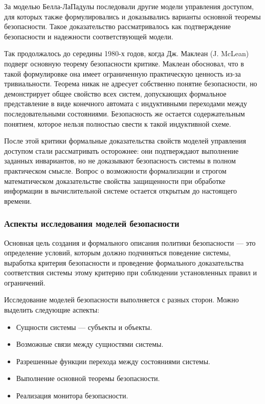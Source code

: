 За моделью Белла-ЛаПадулы последовали другие модели управления доступом, для которых также формулировались и доказывались варианты основной теоремы безопасности. Такое доказательство рассматривалось как подтверждение безопасности и надежности соответствующей модели.

Так продолжалось до середины 1980-х годов, когда Дж. Маклеан (J. McLean) подверг основную теорему безопасности критике. Маклеан обосновал, что в такой формулировке она имеет ограниченную практическую ценность из-за тривиальности. Теорема никак не адресует собственно понятие безопасности, но демонстрирует общее свойство всех систем, допускающих формальное представление в виде конечного автомата с индуктивными переходами между последовательными состояниями. Безопасность же остается содержательным понятием, которое нельзя полностью свести к такой индуктивной схеме.

После этой критики формальные доказательства свойств моделей управления доступом стали рассматривать осторожнее: они подтверждают выполнение заданных инвариантов, но не доказывают безопасность системы в полном практическом смысле. Вопрос о возможности формализации и строгом математическом доказательстве свойства защищенности при обработке информации в вычислительной системе остается открытым до настоящего времени.

\subsubsection{Аспекты исследования моделей безопасности}

Основная цель создания и формального описания политики безопасности --- это определение условий, которым должно подчиняться поведение системы, выработка критерия безопасности и проведение формального доказательства соответствия системы этому критерию при соблюдении установленных правил и ограничений.

Исследование моделей безопасности выполняется с разных сторон. Можно выделить следующие аспекты:

\begin{itemize}
	\item Сущности системы --- субъекты и объекты.
	\item Возможные связи между сущностями системы.
	\item Разрешенные функции перехода между состояниями системы.
	\item Выполнение основной теоремы безопасности.
	\item Реализация монитора безопасности.
\end{itemize}

